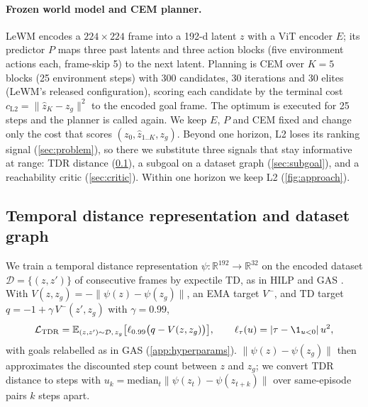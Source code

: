 \documentclass{article} %
\newcommand{\z}{z}
\newcommand{\psiT}{\psi}
\begin{document}
\paragraph{Frozen world model and CEM planner.}
LeWM \citep{lewm} encodes a $224\times224$ frame into a 192-d latent $\z$ with a ViT encoder $E$;
its predictor $P$ maps three past latents and three action blocks (five environment actions each,
frame-skip 5) to the next latent. Planning is CEM over $K=5$ blocks (25 environment steps) with
300 candidates, 30 iterations and 30 elites (LeWM's released configuration), scoring each candidate
by the terminal cost $c_{\mathrm{L2}}=\|\hat\z_K-\z_g\|^2$ to the encoded goal frame. The optimum is
executed for 25 steps and the planner is called again. We keep $E$, $P$ and CEM fixed and change
only the cost that scores $(\z_0,\hat\z_{1..K},\z_g)$. Beyond one horizon, L2 loses its ranking
signal (\cref{sec:problem}), so there we substitute three signals that stay informative at range:
TDR distance (\cref{sec:graph}), a subgoal on a dataset graph (\cref{sec:subgoal}), and a
reachability critic (\cref{sec:critic}). Within one horizon we keep L2 (\cref{fig:approach}).

\subsection{Temporal distance representation and dataset graph}
\label{sec:graph}
We train a temporal distance representation $\psiT:\mathbb{R}^{192}\to\mathbb{R}^{32}$ on the
encoded dataset $\mathcal{D}=\{(\z,\z')\}$ of consecutive frames by expectile TD, as in HILP and
GAS \citep{hilp,gas}. With $V(\z,\z_g)=-\|\psiT(\z)-\psiT(\z_g)\|$, an EMA target $V^-$, and TD
target $q=-1+\gamma\,V^-(\z',\z_g)$ with $\gamma=0.99$,
\begin{equation}
  \mathcal{L}_{\mathrm{TDR}}=\mathbb{E}_{(\z,\z')\sim\mathcal{D},\,\z_g}\big[\ell_{0.99}\big(q-V(\z,\z_g)\big)\big],
  \qquad \ell_\tau(u)=|\tau-\1_{u<0}|\,u^2,
  \label{eq:tdr}
\end{equation}
with goals relabelled as in GAS (\cref{app:hyperparams}). $\|\psiT(\z)-\psiT(\z_g)\|$ then
approximates the discounted step count between $\z$ and $\z_g$; we convert TDR distance to steps
with $u_k=\mathrm{median}_t\|\psiT(\z_t)-\psiT(\z_{t+k})\|$ over same-episode pairs $k$ steps apart.
\end{document}
